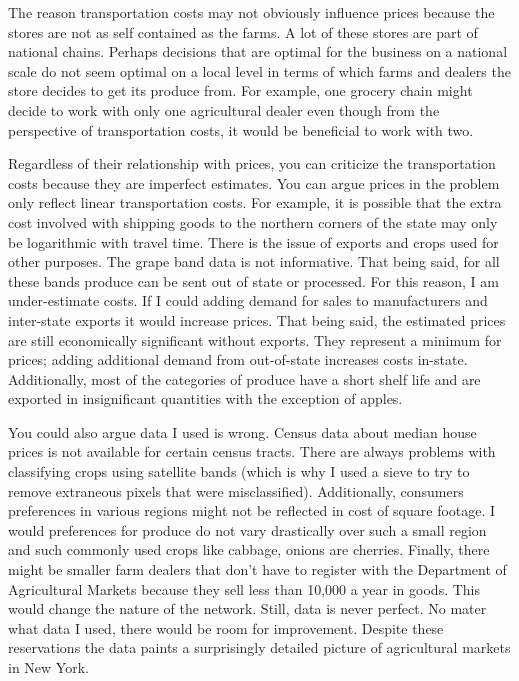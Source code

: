 \documentclass{report}
\begin{document}
The reason transportation costs may not obviously influence prices because the stores are not as self contained as the farms. A lot of these stores are part of national chains. Perhaps decisions that are optimal for the business on a national scale do not seem optimal on a local level in terms of which farms and dealers the store decides to get its produce from. For example, one grocery chain might decide to work with only one agricultural dealer even though from the perspective of transportation costs, it would be beneficial to work with two.

Regardless of their relationship with prices, you can criticize the transportation costs because they are imperfect estimates. You can argue prices in the problem only reflect linear transportation costs. For example, it is possible that the extra cost involved with shipping goods to the northern corners of the state may only be logarithmic with travel time. There is the issue of exports and crops used for other purposes. The grape band data is not informative. That being said, for all these bands produce can be sent out of state or processed. For this reason, I am under-estimate costs. If I could adding demand for sales to manufacturers and inter-state exports it would increase prices. That being said, the estimated prices are still economically significant without exports. They represent a minimum for prices; adding additional demand from out-of-state increases costs in-state. Additionally, most of the categories of produce have a short shelf life and are exported in insignificant quantities with the exception of apples.

You could also argue data I used is wrong. Census data about median house prices is not available for certain census tracts. There are always problems with classifying crops using satellite bands (which is why I used a sieve to try to remove extraneous pixels that were misclassified). Additionally, consumers preferences in various regions might not be reflected in cost of square footage. I would preferences for produce do not vary drastically over such a small region and such commonly used crops like cabbage, onions are cherries. Finally, there might be smaller farm dealers that don't have to register with the Department of Agricultural Markets because they sell less than 10,000 a year in goods. This would change the nature of the network. Still, data is never perfect. No mater what data I used, there would be room for improvement. Despite these reservations the data paints a surprisingly detailed picture of agricultural markets in New York. 
\end{document}
